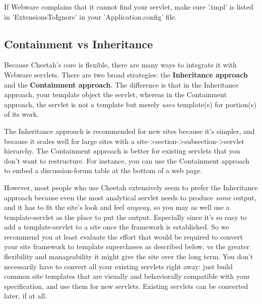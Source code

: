 If Webware complains that it cannot find your servlet, make sure
'.tmpl' is listed in 'ExtensionsToIgnore' in your 'Application.config' file.




\subsection{Containment vs Inheritance}
\label{webware.background}

Because Cheetah's core is flexible, there are many ways to integrate it with
Webware servlets.  There are two broad strategies: the {\bf Inheritance
approach} and the {\bf Containment approach}.  The difference is
that in the Inheritance approach, your template object  the
servlet, whereas in the Containment approach, the servlet is not a template but
merely {\em uses} template(s) for portion(s) of its work.

The Inheritance approach is recommended for new sites because it's simpler, and
because it scales well for large sites with a
site->section->subsection->servlet hierarchy.  The Containment approach is
better for existing servlets that you don't want to restructure.  For instance,
you can use the Containment approach to embed a discussion-forum table at the
bottom of a web page.  

However, most people who use Cheetah extensively seem
to prefer the Inheritance approach because even the most analytical servlet
needs to produce {\em some} output, and it has to fit the site's look and feel
{\em anyway}, so you may as well use a template-servlet as the place to put the
output.  Especially since it's so easy to add a template-servlet to a site once
the framework is established.  So we recommend you at least evaluate the
effort that would be required to convert your site framework to template
superclasses as described below, vs the greater flexibility and manageability
it might give the site over the long term.  You don't necessarily have to
convert all your existing servlets right away: just build common site templates
that are visually and behaviorally compatible with your specification, and use
them for new servlets.  Existing servlets can be converted later, if at all.

